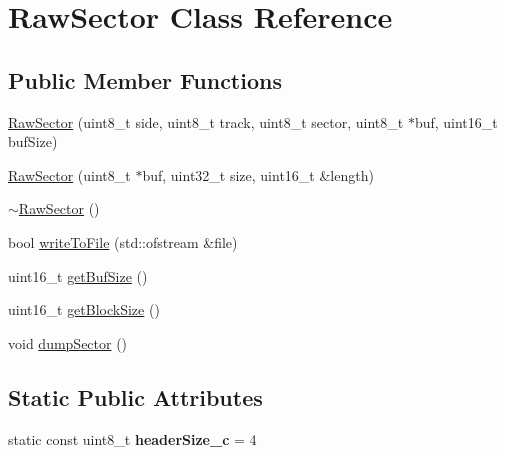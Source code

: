 \hypertarget{classRawSector}{}\section{Raw\+Sector Class Reference}
\label{classRawSector}
\subsection*{Public Member Functions}
\begin{DoxyCompactItemize}
\item 
\hyperlink{classRawSector_aab8c7e37912c1e0a202fced4e38a7cf2}{Raw\+Sector} (uint8\+\_\+t side, uint8\+\_\+t track, uint8\+\_\+t sector, uint8\+\_\+t $\ast$buf, uint16\+\_\+t buf\+Size)
\item 
\hyperlink{classRawSector_aae1fd3df7895272b1293c8fcba3237a3}{Raw\+Sector} (uint8\+\_\+t $\ast$buf, uint32\+\_\+t size, uint16\+\_\+t \&length)
\item 
\hyperlink{classRawSector_ab0d545dbebfb52c8381084d23f3eebf9}{$\sim$\+Raw\+Sector} ()
\item 
bool \hyperlink{classRawSector_ade2a6ad9839a90d53d176d088112933d}{write\+To\+File} (std\+::ofstream \&file)
\item 
uint16\+\_\+t \hyperlink{classRawSector_af2fcbc00a76de74b6341144bc901b684}{get\+Buf\+Size} ()
\item 
uint16\+\_\+t \hyperlink{classRawSector_a186880d783789b622a2ce2f42792276c}{get\+Block\+Size} ()
\item 
void \hyperlink{classRawSector_acc17f663cd4f8ca440d9636ab2f7fb9c}{dump\+Sector} ()
\end{DoxyCompactItemize}
\subsection*{Static Public Attributes}
\begin{DoxyCompactItemize}
\item 
\hypertarget{classRawSector_ac160cf6c0debc82bd3cac5b41c69be0e}{}static const uint8\+\_\+t {\bfseries header\+Size\+\_\+c} = 4\label{classRawSector_ac160cf6c0debc82bd3cac5b41c69be0e}

\end{DoxyCompactItemize}
